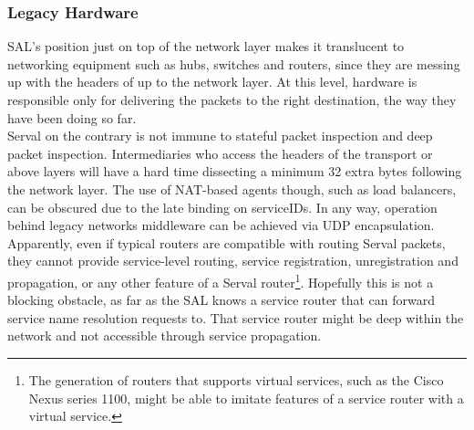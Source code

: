 \subsubsection{Legacy Hardware}
SAL's position just on top of the network layer makes it translucent to networking equipment such as hubs, switches and routers, since they are messing up with the headers of up to the network layer.
At this level, hardware is responsible only for delivering the packets to the right destination, the way they have been doing so far.
\\ \indent Serval on the contrary is not immune to stateful packet inspection and deep packet inspection.
Intermediaries who access the headers of the transport or above layers will have a hard time dissecting a minimum 32 extra bytes following the network layer.
The use of NAT-based agents though, such as load balancers, can be obscured due to the late binding on serviceIDs.
In any way, operation behind legacy networks middleware can be achieved via UDP encapsulation.
\\ \indent Apparently, even if typical routers are compatible with routing Serval packets, they cannot provide service-level routing, service registration, unregistration and propagation, or any other feature of a Serval router\footnote{The generation of routers that supports virtual services, such as the Cisco Nexus series 1100, might be able to imitate features of a service router with a virtual service.}.
Hopefully this is not a blocking obstacle, as far as the SAL knows a service router that can forward service name resolution requests to.
That service router might be deep within the network and not accessible through service propagation.

